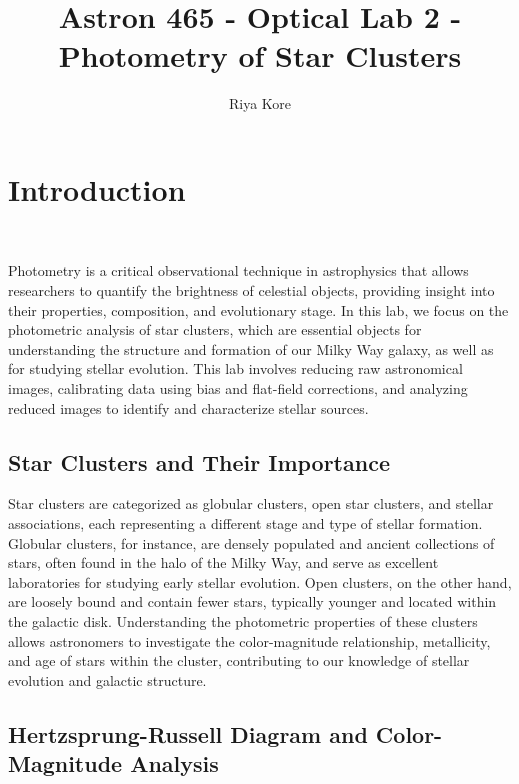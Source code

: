 \documentclass[linenumbers,twocolumn]{aastex631}
\begin{document}
\title{Astron 465 - Optical Lab 2 - Photometry of Star Clusters}



\author[0009-0002-9802-0511]{Riya Kore}

\section{Introduction}\


Photometry is a critical observational technique in astrophysics that allows researchers to quantify the brightness of celestial objects, providing insight into their properties, composition, and evolutionary stage. In this lab, we focus on the photometric analysis of star clusters, which are essential objects for understanding the structure and formation of our Milky Way galaxy, as well as for studying stellar evolution. This lab involves reducing raw astronomical images, calibrating data using bias and flat-field corrections, and analyzing reduced images to identify and characterize stellar sources.

\subsection{Star Clusters and Their Importance}

Star clusters are categorized as globular clusters, open star clusters, and stellar associations, each representing a different stage and type of stellar formation. Globular clusters, for instance, are densely populated and ancient collections of stars, often found in the halo of the Milky Way, and serve as excellent laboratories for studying early stellar evolution. Open clusters, on the other hand, are loosely bound and contain fewer stars, typically younger and located within the galactic disk. Understanding the photometric properties of these clusters allows astronomers to investigate the color-magnitude relationship, metallicity, and age of stars within the cluster, contributing to our knowledge of stellar evolution and galactic structure.

\subsection{Hertzsprung-Russell Diagram and Color-Magnitude Analysis}
\end{document}
